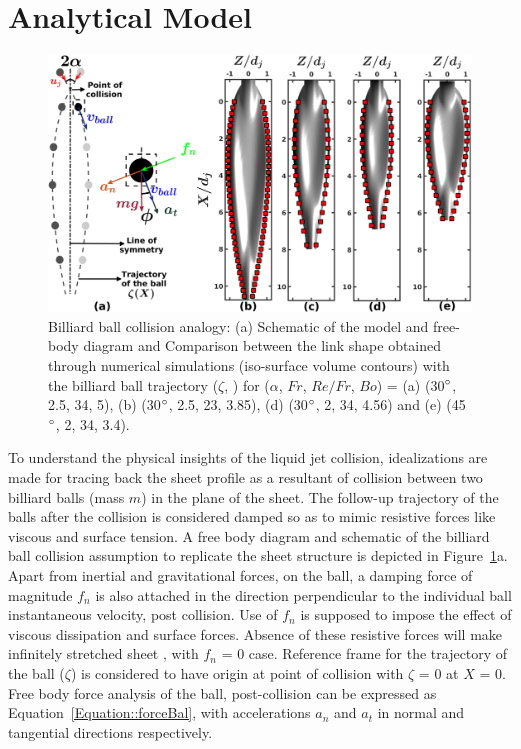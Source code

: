 \documentclass{jfm}
\begin{document}
\section{Analytical Model}	
\begin{figure}
	\centering
	\includegraphics[width=\linewidth]{Figure7}
	\caption{Billiard ball collision analogy: (a) Schematic of the model and free-body diagram and Comparison between the link shape obtained through numerical simulations (iso-surface volume contours) with the billiard ball trajectory ($\zeta$, \protect\MarkerSquareRed) for ($\alpha$, $Fr$, $Re/Fr$, $Bo$) = (a) (30$\degree$, 2.5, 34, 5), (b) (30$\degree$, 2.5, 23, 3.85), (d) (30$\degree$, 2, 34, 4.56) and (e) (45$\degree$, 2, 34, 3.4).}
	\label{Figure::analytical}
\end{figure}
To understand the physical insights of the liquid jet collision, idealizations are made for tracing back the sheet profile as a resultant of collision between two billiard balls (mass $m$) in the plane of the sheet. The follow-up trajectory of the balls after the collision is considered damped so as to mimic resistive forces like viscous and surface tension. A free body diagram and schematic of the billiard ball collision assumption to replicate the sheet structure is depicted in Figure~\ref{Figure::analytical}a. Apart from inertial and gravitational forces, on the ball, a damping force of magnitude $f_n$ is also attached in the direction perpendicular to the individual ball instantaneous velocity, post collision. Use of $f_n$ is supposed to impose the effect of viscous dissipation and surface forces. Absence of these resistive forces will make infinitely stretched sheet \citep{taylor1960formation}, with $f_n$ = 0 case. Reference frame for the trajectory of the ball ($\zeta$) is considered to have origin at point of collision with $\zeta$ = 0 at $X$ = 0. Free body force analysis of the ball, post-collision can be expressed as Equation~\ref{Equation::forceBal}, with accelerations $a_n$ and $a_t$ in normal and tangential directions respectively.
\end{document}

